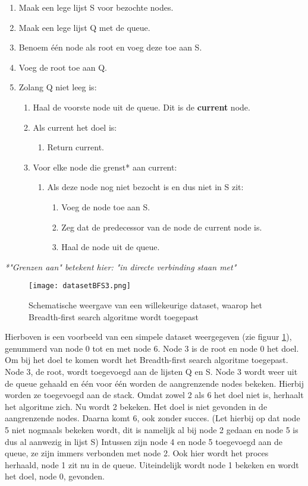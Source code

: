 \begin{enumerate}
\item Maak een lege lijst S voor bezochte nodes.
\item Maak een lege lijst Q met de queue.
\item Benoem \'e\'en node als root en voeg deze toe aan S.
\item Voeg de root toe aan Q. 
\item Zolang Q niet leeg is:
	\begin{enumerate}
	\item Haal de voorste node uit de queue. Dit is de \textbf{current} node.
	\item Als current het doel is:
		\begin{enumerate}
		\item Return current.
		\end{enumerate}
	\item Voor elke node die grenst* aan current:
		\begin{enumerate}
		\item Als deze node nog niet bezocht is en dus niet in S zit:
			\begin{enumerate}
			\item Voeg de node toe aan S.
			\item Zeg dat de predecessor van de node de current node is.
			\item Haal de node uit de queue.
			\end{enumerate}
		\end{enumerate}
	\end{enumerate}
\end{enumerate}

\textit{*"Grenzen aan" betekent hier: "in directe verbinding staan met"}

\begin{figure}[H]
  \centering
    \texttt{[image: datasetBFS3.png]}
  \caption{Schematische weergave van een willekeurige dataset, waarop het Breadth-first search algoritme wordt toegepast}
  \label{fig:datasetBFS3}
\end{figure}

Hierboven is een voorbeeld van een simpele dataset weergegeven (zie figuur \ref{fig:datasetBFS3}), genummerd van node 0 tot en met node 6. Node 3 is de root en node 0 het doel. Om bij het doel te komen wordt het Breadth-first search algoritme toegepast. Node 3, de root, wordt toegevoegd aan de lijsten Q en S. Node 3 wordt weer uit de queue gehaald en \'e\'en voor \'e\'en worden de aangrenzende nodes bekeken. Hierbij worden ze toegevoegd aan de stack. Omdat zowel 2 als 6 het doel niet is, herhaalt het algoritme zich. Nu wordt 2 bekeken. Het doel is niet gevonden in de aangrenzende nodes. Daarna komt 6, ook zonder succes. (Let hierbij op dat node 5 niet nogmaals bekeken wordt, dit is namelijk al bij node 2 gedaan en node 5 is dus al aanwezig in lijst S) Intussen zijn node 4 en node 5 toegevoegd aan de queue, ze zijn immers verbonden met node 2. Ook hier wordt het proces herhaald, node 1 zit nu in de queue. Uiteindelijk wordt node 1 bekeken en wordt het doel, node 0, gevonden.


